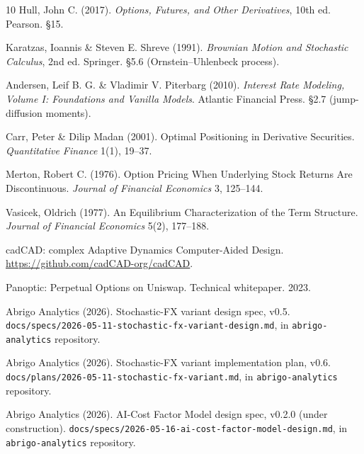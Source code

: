 \documentclass[11pt,letterpaper]{article}
\begin{document}

\begin{thebibliography}{10}
    Hull, John C. (2017). \emph{Options, Futures, and Other Derivatives},
    10th ed. Pearson. \S15.

    Karatzas, Ioannis \& Steven E. Shreve (1991).
    \emph{Brownian Motion and Stochastic Calculus},
    2nd ed. Springer. \S5.6 (Ornstein--Uhlenbeck process).

    Andersen, Leif B. G. \& Vladimir V. Piterbarg (2010).
    \emph{Interest Rate Modeling, Volume I: Foundations and Vanilla Models}.
    Atlantic Financial Press. \S2.7 (jump-diffusion moments).

    Carr, Peter \& Dilip Madan (2001).
    Optimal Positioning in Derivative Securities.
    \emph{Quantitative Finance} 1(1), 19--37.

    Merton, Robert C. (1976).
    Option Pricing When Underlying Stock Returns Are Discontinuous.
    \emph{Journal of Financial Economics} 3, 125--144.

    Vasicek, Oldrich (1977).
    An Equilibrium Characterization of the Term Structure.
    \emph{Journal of Financial Economics} 5(2), 177--188.

    cadCAD: complex Adaptive Dynamics Computer-Aided Design.
    \url{https://github.com/cadCAD-org/cadCAD}.

    Panoptic: Perpetual Options on Uniswap.
    Technical whitepaper. 2023.

    Abrigo Analytics (2026). Stochastic-FX variant design spec, v0.5.
    \texttt{docs/specs/2026-05-11-stochastic-fx-variant-design.md},
    in \texttt{abrigo-analytics} repository.

    Abrigo Analytics (2026). Stochastic-FX variant implementation plan, v0.6.
    \texttt{docs/plans/2026-05-11-stochastic-fx-variant.md},
    in \texttt{abrigo-analytics} repository.

    Abrigo Analytics (2026). AI-Cost Factor Model design spec, v0.2.0
    (under construction).
    \texttt{docs/specs/2026-05-16-ai-cost-factor-model-design.md},
    in \texttt{abrigo-analytics} repository.

\end{thebibliography}
\end{document}

